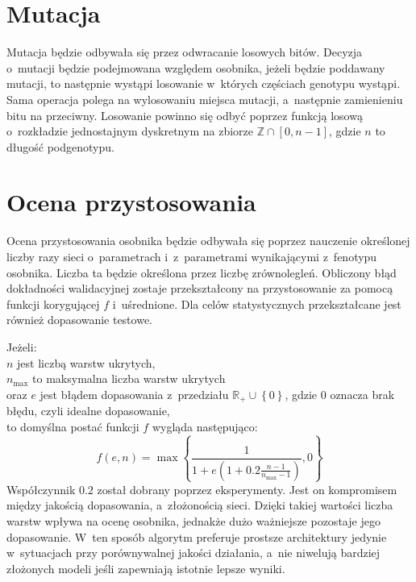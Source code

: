 \section{Mutacja}
\label{sec:mutate}
Mutacja będzie odbywała się
przez odwracanie losowych bitów.
Decyzja o~mutacji będzie
podejmowana względem osobnika,
jeżeli będzie poddawany mutacji,
to następnie wystąpi losowanie
w~których częściach genotypu wystąpi.
Sama operacja polega na wylosowaniu miejsca mutacji,
a~następnie zamienieniu bitu na przeciwny.
Losowanie powinno się odbyć poprzez funkcją losową
o~rozkładzie jednostajnym dyskretnym na zbiorze
$\mathbb{Z} \cap \left[0, n-1\right]$,
gdzie $n$ to długość podgenotypu.

\section{Ocena przystosowania}
\label{sec:fittness}
Ocena przystosowania osobnika będzie odbywała się poprzez
nauczenie określonej liczby razy sieci o~parametrach
i~z~parametrami wynikającymi z~fenotypu osobnika.
Liczba ta będzie określona przez liczbę zrównolegleń.
Obliczony błąd dokładności walidacyjnej zostaje
przekształcony na przystosowanie za pomocą funkcji
korygującej $f$ i~uśrednione.
Dla celów statystycznych przekształcane
jest również dopasowanie testowe.

Jeżeli:\\
$n$ jest liczbą warstw ukrytych,\\
$n_{\max}$ to maksymalna liczba warstw ukrytych\\
oraz $e$ jest błądem dopasowania
  z~przedziału $\mathbb{R}_{+} \cup \left\{0\right\}$,
  gdzie $0$ oznacza brak błędu,
  czyli idealne dopasowanie,\\
to domyślna postać funkcji $f$ wygląda następująco:
\begin{equation}
  \label{eq:correction_f}
  f\left(e, n\right)
    =\max{\left\{\frac{1}{
      1 + e \left(
        1
        + 0.2 \frac{n-1}{n_{\max}-1}
      \right)
    }, 0\right\}}
\end{equation}
Współczynnik $0.2$ został dobrany poprzez eksperymenty.
Jest on kompromisem między jakością
dopasowania, a~złożonością sieci.
Dzięki takiej wartości liczba warstw
wpływa na ocenę osobnika,
jednakże dużo ważniejsze pozostaje jego dopasowanie.
W~ten sposób algorytm preferuje prostsze
architektury jedynie w~sytuacjach
przy porównywalnej jakości działania,
a~nie niwelują bardziej złożonych modeli
jeśli zapewniają istotnie lepsze wyniki.

